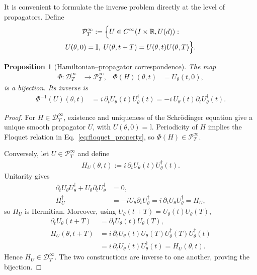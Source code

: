\documentclass[twocolumn,prl,aps,floatfix]{revtex4-2}
\newtheorem{proposition}{Proposition}
\begin{document}
It is convenient to formulate the inverse problem directly at the level of propagators. Define
\begin{multline}
\mathcal P_T^\infty
:=
\Bigl\{
U\in C^\infty(I\times\mathbb R,U(d)):
\\
U(\theta,0)=\mathbb I,\;
U(\theta,t+T)=U(\theta,t)U(\theta,T)
\Bigr\}.
\end{multline}

\begin{proposition}[Hamiltonian--propagator correspondence]
The map
\begin{align}
\Phi:\mathcal D_T^\infty&\longrightarrow\mathcal P_T^\infty,
&
\Phi(H)(\theta,t)&=U_\theta(t,0),
\end{align}
is a bijection. Its inverse is
\begin{align}
\Phi^{-1}(U)(\theta,t)
&=
i\,\partial_tU_\theta(t)U_\theta^\dagger(t)
=
-i\,U_\theta(t)\partial_tU_\theta^\dagger(t).
\label{eq:H_from_U}
\end{align}
\end{proposition}

\begin{proof}
For $H\in\mathcal D_T^\infty$, existence and uniqueness of the Schrödinger equation give a unique smooth propagator $U$, with $U(\theta,0)=\mathbb I$. Periodicity of $H$ implies the Floquet relation in Eq.~\eqref{eq:floquet_property}, so $\Phi(H)\in\mathcal P_T^\infty$.

Conversely, let $U\in\mathcal P_T^\infty$ and define
\begin{align}
H_U(\theta,t)
:=
i\,\partial_tU_\theta(t)U_\theta^\dagger(t).
\end{align}
Unitarity gives
\begin{align}
\partial_tU_\theta U_\theta^\dagger
+
U_\theta\partial_tU_\theta^\dagger
&=0,
\\
H_U^\dagger
&=
-iU_\theta\partial_tU_\theta^\dagger
=
i\,\partial_tU_\theta U_\theta^\dagger
=
H_U,
\end{align}
so $H_U$ is Hermitian. Moreover, using
$U_\theta(t+T)=U_\theta(t)U_\theta(T)$,
\begin{align}
\partial_tU_\theta(t+T)
&=
\partial_tU_\theta(t)U_\theta(T),
\\
H_U(\theta,t+T)
&=
i\,\partial_tU_\theta(t)
U_\theta(T)U_\theta^\dagger(T)
U_\theta^\dagger(t)
\nonumber\\
&=
i\,\partial_tU_\theta(t)U_\theta^\dagger(t)
=
H_U(\theta,t).
\end{align}
Hence $H_U\in\mathcal D_T^\infty$. The two constructions are inverse to one another, proving the bijection.
\end{proof}
\end{document}
